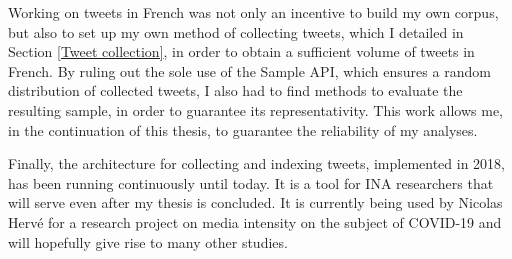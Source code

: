 Working on tweets in French was not only an incentive to build my own corpus, but also to set up my own method of collecting tweets, which I detailed in Section \ref{Tweet collection}, in order to obtain a sufficient volume of tweets in French. By ruling out the sole use of the Sample API, which ensures a random distribution of collected tweets, I also had to find methods to evaluate the resulting sample, in order to guarantee its representativity. This work allows me, in the continuation of this thesis, to guarantee the reliability of my analyses.


Finally, the architecture for collecting and indexing tweets, implemented in 2018, has been running continuously until today. It is a tool for INA researchers that will serve even after my thesis is concluded. It is currently being used by Nicolas Hervé for a research project on media intensity on the subject of COVID-19  and will hopefully give rise to many other studies.